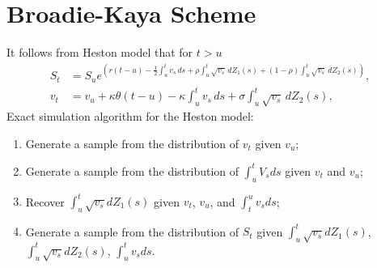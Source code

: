         \section{Broadie-Kaya Scheme}
        It follows from Heston model that for $t > u$
        \begin{align}
            S_t &= S_u e^{\left( r(t-u)-\frac{1}{2} \int_{u}^{t} v_s \, ds  + \rho\int_{u}^{t} \sqrt{v_s} \, dZ_1(s) + (1-\rho)\int_{u}^{t} \sqrt{v_s} \, dZ_2(s)  \right)}, \label{BK:Price_int} \\
            v_t &= v_u + \kappa\theta(t-u) - \kappa \int_{u}^{t} v_s \, ds + \sigma\int_{u}^{t} \sqrt{v_s} \, dZ_2(s), \label{BK:Vol_int}
        \end{align}
        Exact simulation algorithm for the Heston model:
        \begin{enumerate}
            \item Generate a sample from the distribution of $v_t$ given $v_u$;
            \item Generate a sample from the distribution of $\int_{u}^t V_s ds$ given $v_t$ and $v_u$;
            \item Recover $\int_{u}^t \sqrt{v_s} dZ_1(s)$ given $v_t$, $v_u$, and $\int_{t}^u v_s ds$;
            \item Generate a sample from the distribution of $S_t$ given $\int_u^t \sqrt{v_s} dZ_1(s)$, $\int_u^t \sqrt{v_s} dZ_2(s)$, $\int_u^t v_s ds$.
        \end{enumerate}

